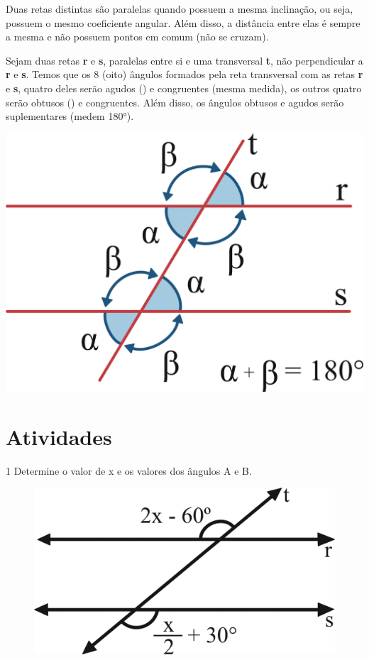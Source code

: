 {Duas retas distintas são paralelas quando possuem a mesma inclinação, ou
seja, possuem o mesmo coeficiente angular. Além disso, a distância entre
elas é sempre a mesma e não possuem pontos em comum (não se cruzam).

Sejam duas retas \textbf{r} e \textbf{s}, paralelas entre si e uma transversal 
\textbf{t}, não perpendicular a \textbf{r} e \textbf{s}. Temos que os 8 (oito)
ângulos formados pela reta transversal com as retas \textbf{r} e \textbf{s}, 
quatro deles serão agudos (\alpha) e congruentes (mesma medida), os outros quatro
serão obtusos (\beta) e congruentes. Além disso, os ângulos obtusos e agudos serão 
suplementares (medem 180°).

\includegraphics[width=.5\textwidth]{./ilustras-mat/modulo_11_exemplo.png}
}

\pagebreak
\section*{Atividades}

\num{1} Determine o valor de x e os valores dos ângulos A e B.

\begin{figure}[htpb!]
\centering
\includegraphics[width=.6\textwidth]{./ilustras-mat/modulo_11-atividade_1.png}
\end{figure}


\begin{emptybox}
\end{emptybox}

